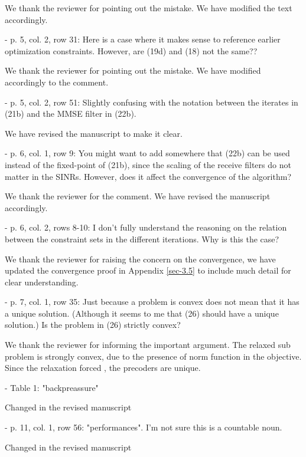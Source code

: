 \begin{itemize}
\begin{itemize}
\resp We thank the reviewer for pointing out the mistake. We have modified the text accordingly.

 - p. 5, col. 2, row 31: Here is a case where it makes sense to reference earlier optimization constraints. However, are (19d) and (18) not the same??

\resp We thank the reviewer for pointing out the mistake. We have modified accordingly to the comment.

 - p. 5, col. 2, row 51: Slightly confusing with the notation between the iterates in (21b) and the MMSE filter in (22b).

\resp We have revised the manuscript to make it clear.

 - p. 6, col. 1, row 9: You might want to add somewhere that (22b) can be used instead of the fixed-point of (21b), since the scaling of the receive filters do not matter in the SINRs. However, does it affect the convergence of the algorithm?

\resp We thank the reviewer for the comment. We have revised the manuscript accordingly.

 - p. 6, col. 2, rows 8-10: I don't fully understand the reasoning on the relation between the constraint sets in the different iterations. Why is this the case?

\resp We thank the reviewer for raising the concern on the convergence, we have updated the convergence proof in Appendix \ref{sec-3.5} to include much detail for clear understanding.


 - p. 7, col. 1, row 35: Just because a problem is convex does not mean that it has a unique solution. (Although it seems to me that (26) should have a unique solution.) Is the problem in (26) strictly convex?

\resp We thank the reviewer for informing the important argument. The relaxed sub problem is strongly convex, due to the presence of norm function in the objective. Since the relaxation forced , the precoders are unique.

 - Table 1: "backpreassure"

\resp Changed in the revised manuscript

 - p. 11, col. 1, row 56: "performances". I'm not sure this is a countable noun.

\resp Changed in the revised manuscript

\end{itemize}

\end{itemize}